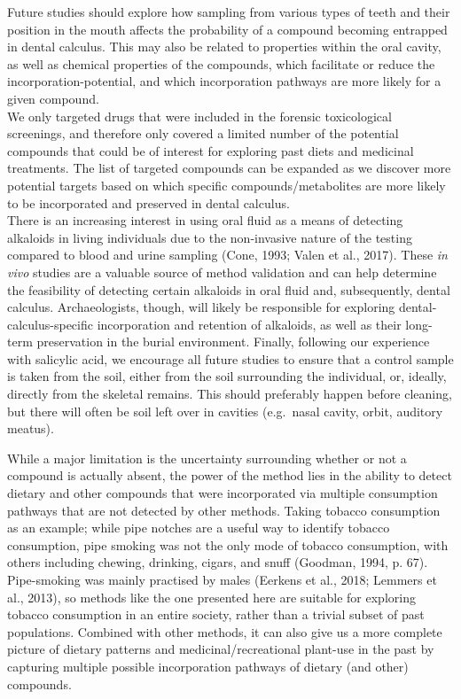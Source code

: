 \documentclass[
]{article}
\begin{document}
Future studies should explore how sampling from various types of teeth
and their position in the mouth affects the probability of a compound
becoming entrapped in dental calculus. This may also be related to
properties within the oral cavity, as well as chemical properties of the
compounds, which facilitate or reduce the incorporation-potential, and
which incorporation pathways are more likely for a given compound.\\
We only targeted drugs that were included in the forensic toxicological
screenings, and therefore only covered a limited number of the potential
compounds that could be of interest for exploring past diets and
medicinal treatments. The list of targeted compounds can be expanded as
we discover more potential targets based on which specific
compounds/metabolites are more likely to be incorporated and preserved
in dental calculus.\\
There is an increasing interest in using oral fluid as a means of
detecting alkaloids in living individuals due to the non-invasive nature
of the testing compared to blood and urine sampling (Cone, 1993; Valen
et al., 2017). These \emph{in vivo} studies are a valuable source of
method validation and can help determine the feasibility of detecting
certain alkaloids in oral fluid and, subsequently, dental calculus.
Archaeologists, though, will likely be responsible for exploring
dental-calculus-specific incorporation and retention of alkaloids, as
well as their long-term preservation in the burial environment. Finally,
following our experience with salicylic acid, we encourage all future
studies to ensure that a control sample is taken from the soil, either
from the soil surrounding the individual, or, ideally, directly from the
skeletal remains. This should preferably happen before cleaning, but
there will often be soil left over in cavities (e.g.~nasal cavity,
orbit, auditory meatus).

While a major limitation is the uncertainty surrounding whether or not a
compound is actually absent, the power of the method lies in the ability
to detect dietary and other compounds that were incorporated via
multiple consumption pathways that are not detected by other methods.
Taking tobacco consumption as an example; while pipe notches are a
useful way to identify tobacco consumption, pipe smoking was not the
only mode of tobacco consumption, with others including chewing,
drinking, cigars, and snuff (Goodman, 1994, p. 67). Pipe-smoking was
mainly practised by males (Eerkens et al., 2018; Lemmers et al., 2013),
so methods like the one presented here are suitable for exploring
tobacco consumption in an entire society, rather than a trivial subset
of past populations. Combined with other methods, it can also give us a
more complete picture of dietary patterns and medicinal/recreational
plant-use in the past by capturing multiple possible incorporation
pathways of dietary (and other) compounds.
\end{document}
